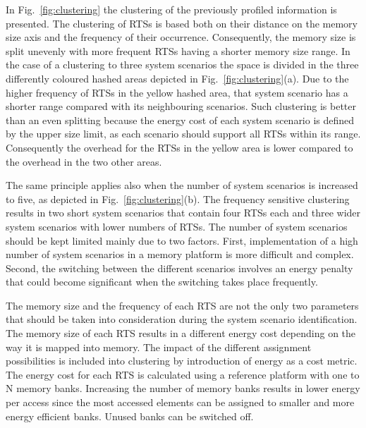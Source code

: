 \documentclass[smallcondensed]{svjour3}
\begin{document}
In Fig.~\ref{fig:clustering} the clustering of the previously profiled information is presented. 
The clustering of RTSs is based both on their distance on the memory size axis and the frequency of their occurrence. 
Consequently, the memory size is split unevenly with more frequent RTSs having a shorter memory size range. 
In the case of a clustering to three system scenarios the space is divided in the three differently coloured hashed areas depicted in Fig.~\ref{fig:clustering}(a). 
Due to the higher frequency of RTSs in the yellow hashed area, that system scenario has a shorter range compared with its neighbouring scenarios. 
Such clustering is better than an even splitting because the energy cost of each system scenario is defined by the upper size limit, as each scenario should support all RTSs within its range. 
Consequently the overhead for the RTSs in the yellow area is lower compared to the overhead in the two other areas.

The same principle applies also when the number of system scenarios is increased to five, as depicted in Fig.~\ref{fig:clustering}(b). 
The frequency sensitive clustering results in two short system scenarios that contain four RTSs each and three wider system scenarios with lower numbers of RTSs. 
The number of system scenarios should be kept limited mainly due to two factors. 
First, implementation of a high number of system scenarios in a memory platform is more difficult and complex. 
Second, the switching between the different scenarios involves an energy penalty that could become significant when the switching takes place frequently.

The memory size and the frequency of each RTS are not the only two parameters that should be taken into consideration during the system scenario identification. 
The memory size of each RTS results in a different energy cost depending on the way it is mapped into memory. 
The impact of the different assignment possibilities is included into clustering by introduction of energy as a cost metric. 
The energy cost for each RTS is calculated using a reference platform with one to N
memory banks. 
Increasing the number of memory banks results in lower energy per access since the most accessed elements can be assigned to smaller and more energy efficient banks. Unused banks can be switched off.
\end{document}
